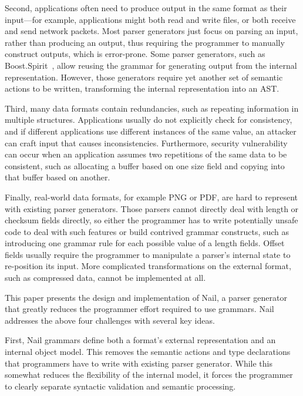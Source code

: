 Second,  applications often need to produce output in the same
format as their input---for example, applications might both
read and write files, or both receive and send network packets.
Most parser generators just focus on parsing an input, rather
than producing an output, thus requiring the programmer to manually
construct outputs, which is error-prone.  Some parser generators, such as
Boost.Spirit~\cite{boost-spirit},
allow reusing the grammar for generating output from the internal
representation.  However, those generators require yet another set of
semantic actions to be written, transforming the internal representation
into an AST\@.

Third, many data formats contain redundancies, such as repeating information in multiple structures.
Applications usually do not explicitly check for consistency, and if different applications use
different instances of the same value, an attacker can craft input that causes inconsistencies.
Furthermore, security vulnerability can occur when an application assumes two repetitions of the
same data to be consistent, such as allocating a buffer based on one size field and copying into
that buffer based on another.

Finally, real-world data formats, for example PNG or PDF,  are hard to represent with
existing parser generators. Those parsers cannot directly deal with length or checksum fields
directly, so either the programmer has to write potentially unsafe code to deal with such features
or build contrived grammar constructs, such as introducing one grammar rule for each possible value
of a length fields. Offset fields usually require the programmer to manipulate a parser's internal
state to re-position its input. More complicated transformations on the external format, such as
compressed data, cannot be implemented at all.



This paper presents the design and implementation of Nail, a parser generator that greatly reduces
the programmer effort required to use grammars. Nail addresses the above four challenges with
several key ideas.

First, Nail grammars define both a format's external representation and an internal object model.
This removes the semantic actions and type declarations that programmers have to write with existing
parser generator. While this somewhat reduces the flexibility of the internal model, it forces the programmer
to clearly separate syntactic validation and semantic processing.

